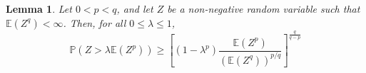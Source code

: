 \documentclass{article}
\newcommand{\1}{\mathbf{1}}
\theoremstyle{alden}
\theoremstyle{aldenthm}
\newtheorem{lemma}{Lemma}
\theoremstyle{definition}
\theoremstyle{remark}
\begin{document}
\begin{lemma}
	\label{lem:paley_zygmund}
	Let $0 < p < q$, and let $Z$ be a non-negative random variable such that $\mathbb{E}(Z^q) < \infty$. Then, for all $0 \leq \lambda \leq 1$,
	\begin{equation}
	\label{eqn:paley_zygmund}
	\mathbb{P}(Z > \lambda \mathbb{E}(Z^p)) \geq \left[(1 - \lambda^p) \frac{\mathbb{E}(Z^p)}{(\mathbb{E}(Z^q))^{p/q}}\right]^{\frac{q}{q - p}}
	\end{equation}
\end{lemma}
\end{document}
